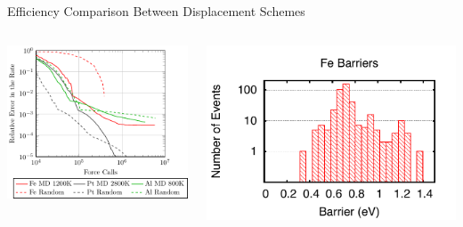 \documentclass[onlymath]{beamer}
\begin{document}
\begin{frame}{Efficiency Comparison Between Displacement Schemes}

\begin{columns}
\begin{column}{0.6\textwidth}
\includegraphics[width=\columnwidth]{images/saddle-search-comparison.pdf}
\end{column}
\begin{column}{0.4\textwidth}
\includegraphics[width=\columnwidth]{images/fe-barriers.pdf}


\end{column}
\end{columns}
\end{frame}
\end{document}
